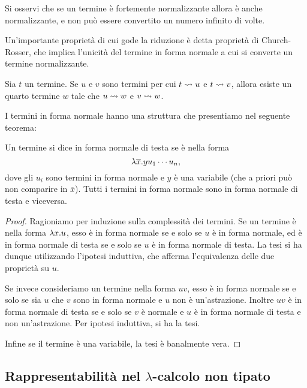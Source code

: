 \documentclass[]{marticle}
\begin{document}
Si osservi che se un termine \`e fortemente normalizzante allora \`e anche
normalizzante, e non pu\`o essere convertito un numero infinito di volte.


Un'importante propriet\`a di cui gode la riduzione \`e detta propriet\`a di
Church-Rosser, che implica l'unicit\`a del termine in forma normale a cui si
converte un termine normalizzante.

\begin{block}[Teorema]
    Sia $t$ un termine. Se $u$ e $v$ sono termini per cui $t\rightsquigarrow u$ e $t\rightsquigarrow
    v$, allora esiste un quarto termine $w$ tale che $u\rightsquigarrow w$ e $v\rightsquigarrow w$.
\end{block}

I termini in forma normale hanno una struttura che presentiamo nel seguente
teorema:
\begin{block}[Proposizione]
    Un termine si dice in forma normale di testa se \`e nella forma
    \[
        \lambda \overline{x}.yu_1\cdots u_n,
    \]
    dove gli $u_i$ sono termini in forma normale e $y$ \`e una variabile (che a
    priori pu\`o non comparire in $\overline{x}$). Tutti i termini in forma
    normale sono in forma normale di testa e viceversa.
\end{block}
\begin{proof}
    Ragioniamo per induzione sulla complessit\`a dei termini. Se un termine \`e
    nella forma $\lambda x.u$, esso \`e in forma normale se e solo se $u$ \`e in
    forma normale, ed \`e in forma normale di testa se e solo se $u$ \`e in
    forma normale di testa. La tesi si ha dunque utilizzando l'ipotesi
    induttiva, che afferma l'equivalenza delle due propriet\`a su $u$. 

    Se invece consideriamo un termine nella forma $uv$, esso \`e in forma
    normale se e solo se sia $u$ che $v$ sono in forma normale e $u$ non \`e
    un'astrazione. Inoltre $uv$ \`e in forma normale di testa se e solo se $v$
    \`e normale e $u$ \`e in forma normale di testa e non un'astrazione. Per
    ipotesi induttiva, si ha la tesi.

    Infine se il termine \`e una variabile, la tesi \`e banalmente vera.
\end{proof}

\subsection{Rappresentabilit\`a nel $\lambda$-calcolo non tipato}
\end{document}
